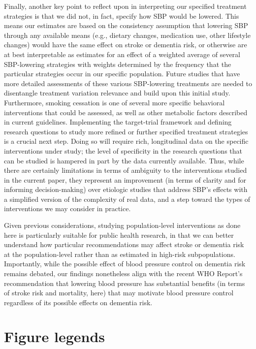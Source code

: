 \documentclass[
]{book}
\begin{document}
Finally, another key point to reflect upon in interpreting our specified treatment strategies is that we did not, in fact, specify how SBP would be lowered. This means our estimates are based on the consistency assumption that lowering SBP through any available means (e.g., dietary changes, medication use, other lifestyle changes) would have the same effect on stroke or dementia risk, or otherwise are at best interpretable as estimates for an effect of a weighted average of several SBP-lowering strategies with weights determined by the frequency that the particular strategies occur in our specific population\autocite{waterkills,hernan2011}. Future studies that have more detailed assessments of these various SBP-lowering treatments are needed to disentangle treatment variation relevance and build upon this initial study. Furthermore, smoking cessation is one of several more specific behavioral interventions that could be assessed, as well as other metabolic factors described in current guidelines\autocite{johnson2019,lancet2020}. Implementing the target-trial framework and defining research questions to study more refined or further specified treatment strategies is a crucial next step. Doing so will require rich, longitudinal data on the specific interventions under study; the level of specificity in the research questions that can be studied is hampered in part by the data currently available. Thus, while there are certainly limitations in terms of ambiguity to the interventions studied in the current paper, they represent an improvement (in terms of clarity and for informing decision-making) over etiologic studies that address SBP's effects with a simplified version of the complexity of real data, and a step toward the types of interventions we may consider in practice.

Given previous considerations, studying population-level interventions as done here is particularly suitable for public health research, in that we can better understand how particular recommendations may affect stroke or dementia risk at the population-level rather than as estimated in high-risk subpopulations. Importantly, while the possible effect of blood pressure control on dementia risk remains debated, our findings nonetheless align with the recent WHO Report's recommendation that lowering blood pressure has substantial benefits (in terms of stroke risk and mortality, here) that may motivate blood pressure control regardless of its possible effects on dementia risk\autocite{who_dementia2019}.

\hypertarget{figure-legends}{%
\section{Figure legends}\label{figure-legends}}
\end{document}
